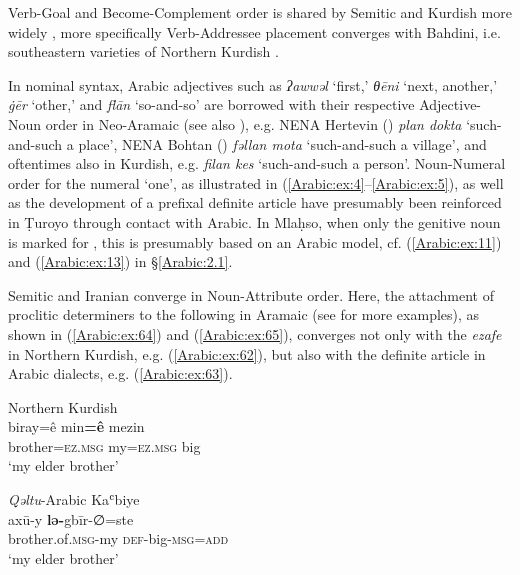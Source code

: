 \documentclass[output=paper,colorlinks,citecolor=brown,draftmode]{langscibook}
\begin{document}
Verb-Goal and Become-Complement order is shared by Semitic and Kurdish more widely \citep{haig_verb-goal_2015,Haig2022PostPredicateCon}, more specifically Verb-Addressee placement converges with Bahdini, i.e. southeastern varieties of Northern Kurdish \citep[354–359]{Haig2022PostPredicateCon}.

\begin{sloppypar}
In nominal syntax, Arabic adjectives such as \textit{ʔawwəl} `first,' \textit{θēni} `next, another,' \textit{ġēr} `other,' and \textit{flān} `so-and-so' are borrowed with their respective Adjective-Noun order in Neo-Aramaic (see also \citealt[40--41]{Waltisberg2016STuroyo}), e.g. NENA Hertevin (\citealt{Jastrow1988NAHertevin}) \textit{plan dokta} `such-and-such a place', NENA Bohtan (\citealt{Fox2009NABohtan}) \textit{fəllan mota} `such-and-such a village', and oftentimes also in Kurdish, e.g. \textit{filan kes} `such-and-such a person'. Noun-Numeral order for the numeral `one', as illustrated in (\ref{Arabic:ex:4}--\ref{Arabic:ex:5}), as well as the development of a prefixal definite article have presumably been reinforced in Ṭuroyo through contact with Arabic. In Mlaḥso, when only the genitive noun is marked for , this is presumably based on an Arabic model, cf. (\ref{Arabic:ex:11}) and (\ref{Arabic:ex:13}) in §\ref{Arabic:2.1}.
\end{sloppypar}

\begin{sloppypar}
Semitic and Iranian converge in Noun-Attribute order. Here, the attachment of proclitic determiners to the following  in Aramaic (see \citealt{Waltisberg2016STuroyo} for more examples), as shown in (\ref{Arabic:ex:64}) and (\ref{Arabic:ex:65}), converges not only with the \textit{ezafe} in Northern Kurdish, e.g. (\ref{Arabic:ex:62}), but also with the definite article in Arabic dialects, e.g. (\ref{Arabic:ex:63}).
\end{sloppypar}

\ea\label{Arabic:ex:62}
Northern Kurdish\\
\gll biray=ê min\textbf{=ê} mezin \\
brother\textsc{=ez.msg} my\textsc{=ez.msg} big  \\
\glt `my elder brother'
\z

\ea\label{Arabic:ex:63}
\textit{Qəltu}-Arabic Kaʿbiye \citep[III:§3]{Jastrow2022CADiyarbakir} \\
\gll axū-y \textbf{lə-}gbīr-∅=ste \\
brother.of\textsc{.msg-}my \textsc{def-}big\textsc{-msg=add} \\
\glt `my elder brother'
\z
\end{document}
